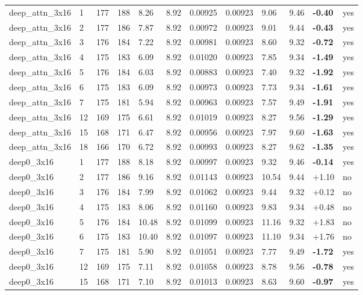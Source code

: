 \documentclass[10pt,a4paper]{article}
\begin{document}
\begin{landscape}
\begin{scriptsize}
\begin{longtable}{llllllllllll}
deep\_attn\_3x16 & 1 & 177 & 188 & 8.26 & 8.92 & 0.00925 & 0.00923 & 9.06 & 9.46 & \textbf{-0.40} & yes \\
deep\_attn\_3x16 & 2 & 177 & 186 & 7.87 & 8.92 & 0.00972 & 0.00923 & 9.01 & 9.44 & \textbf{-0.43} & yes \\
deep\_attn\_3x16 & 3 & 176 & 184 & 7.22 & 8.92 & 0.00981 & 0.00923 & 8.60 & 9.32 & \textbf{-0.72} & yes \\
deep\_attn\_3x16 & 4 & 175 & 183 & 6.09 & 8.92 & 0.01020 & 0.00923 & 7.85 & 9.34 & \textbf{-1.49} & yes \\
deep\_attn\_3x16 & 5 & 176 & 184 & 6.03 & 8.92 & 0.00883 & 0.00923 & 7.40 & 9.32 & \textbf{-1.92} & yes \\
deep\_attn\_3x16 & 6 & 175 & 183 & 6.09 & 8.92 & 0.00973 & 0.00923 & 7.73 & 9.34 & \textbf{-1.61} & yes \\
deep\_attn\_3x16 & 7 & 175 & 181 & 5.94 & 8.92 & 0.00963 & 0.00923 & 7.57 & 9.49 & \textbf{-1.91} & yes \\
deep\_attn\_3x16 & 12 & 169 & 175 & 6.61 & 8.92 & 0.01019 & 0.00923 & 8.27 & 9.56 & \textbf{-1.29} & yes \\
deep\_attn\_3x16 & 15 & 168 & 171 & 6.47 & 8.92 & 0.00956 & 0.00923 & 7.97 & 9.60 & \textbf{-1.63} & yes \\
deep\_attn\_3x16 & 18 & 166 & 170 & 6.72 & 8.92 & 0.00993 & 0.00923 & 8.27 & 9.62 & \textbf{-1.35} & yes \\
deep0\_3x16 & 1 & 177 & 188 & 8.18 & 8.92 & 0.00997 & 0.00923 & 9.32 & 9.46 & \textbf{-0.14} & yes \\
deep0\_3x16 & 2 & 177 & 186 & 9.16 & 8.92 & 0.01143 & 0.00923 & 10.54 & 9.44 & +1.10 & no \\
deep0\_3x16 & 3 & 176 & 184 & 7.99 & 8.92 & 0.01062 & 0.00923 & 9.44 & 9.32 & +0.12 & no \\
deep0\_3x16 & 4 & 175 & 183 & 8.06 & 8.92 & 0.01160 & 0.00923 & 9.83 & 9.34 & +0.48 & no \\
deep0\_3x16 & 5 & 176 & 184 & 10.48 & 8.92 & 0.01099 & 0.00923 & 11.16 & 9.32 & +1.83 & no \\
deep0\_3x16 & 6 & 175 & 183 & 10.40 & 8.92 & 0.01097 & 0.00923 & 11.10 & 9.34 & +1.76 & no \\
deep0\_3x16 & 7 & 175 & 181 & 5.90 & 8.92 & 0.01051 & 0.00923 & 7.77 & 9.49 & \textbf{-1.72} & yes \\
deep0\_3x16 & 12 & 169 & 175 & 7.11 & 8.92 & 0.01058 & 0.00923 & 8.78 & 9.56 & \textbf{-0.78} & yes \\
deep0\_3x16 & 15 & 168 & 171 & 7.10 & 8.92 & 0.01013 & 0.00923 & 8.63 & 9.60 & \textbf{-0.97} & yes \\

\end{longtable}
\end{scriptsize}
\end{landscape}
\end{document}
